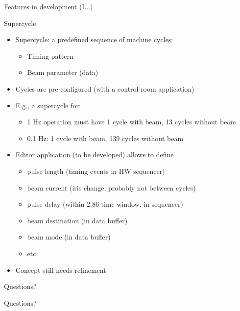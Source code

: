 \documentclass[
  9pt
  , table
  , ignorenonframetext
]{beamer}
\begin{document}
\begin{frame}{Features in development (I...)}
  \begin{block}{Supercycle}
    \begin{itemize}
      \item Supercycle: a predefined sequence of machine cycles:
      \begin{itemize}
        \item Timing pattern
        \item Beam parameter (data)
      \end{itemize}
      \item Cycles are pre-configured (with a control-room application)
      \item E.g., a supercycle for:
      \begin{itemize}
        \item 1 Hz operation must have 1 cycle with beam, 13 cycles without beam
        \item 0.1 Hz: 1 cycle with beam,  139 cycles without beam
      \end{itemize}
      \item Editor application (to be developed) allows to define
      \begin{itemize}
        \item pulse length (timing events in HW sequencer)
        \item beam current (iris change, probably not between cycles)
        \item pulse delay (within 2.86 time window, in sequencer)
        \item beam destination (in data buffer)
        \item beam mode (in data buffer)
        \item etc.
      \end{itemize}
      \item Concept still needs refinement
    \end{itemize}
  \end{block}
\end{frame}


\begin{frame}{Questions?}
  \begin{center}
    {\Huge Questions?}
  \end{center}
\end{frame}
\end{document}
